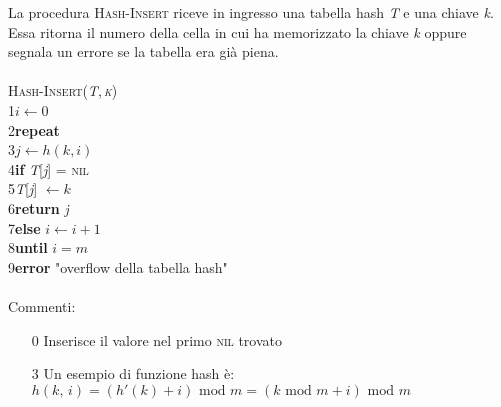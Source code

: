 \documentclass[10pt, a4paper]{report}
\newcommand\firsttab[1][0.5cm]{\hspace*{#1}}
\newcommand\secondtab[1][1cm]{\hspace*{#1}}
\newcommand\thirdtab[1][1.5cm]{\hspace*{#1}}
\begin{document}
La procedura \textsc{Hash-Insert} riceve in ingresso una tabella hash \textit{T} e una chiave \textit{k}. Essa ritorna il numero della cella in cui ha memorizzato la chiave \textit{k} oppure segnala un errore se la tabella era già piena.\\\\
\textsc{Hash-Insert(\textit{T},\,\textit{k})}\\
1\firsttab$i \leftarrow 0$\\
2\firsttab\textbf{repeat}\\
3\secondtab$j \leftarrow h(k,i)$\\
4\secondtab\textbf{if} \textit{T}[\textit{j}] = \textsc{nil}\\
5\thirdtab \textit{T}[\textit{j}] $\leftarrow k$\\
6\thirdtab\textbf{return} \textit{j}\\
7\secondtab\textbf{else} $i \leftarrow i + 1$\\
8\firsttab\textbf{until} $i = m$\\
9\firsttab\textbf{error} "overflow della tabella hash"
\\\\Commenti:
\begin{itemize}
\item[0]Inserisce il valore nel primo \textsc{nil} trovato
\item[3]Un esempio di funzione hash è:\\$h(k,\,i) = (h'(k) + i) \text{ mod } m = (k \text{ mod } m + i) \text{ mod } m$
\end{itemize}
\end{document}
